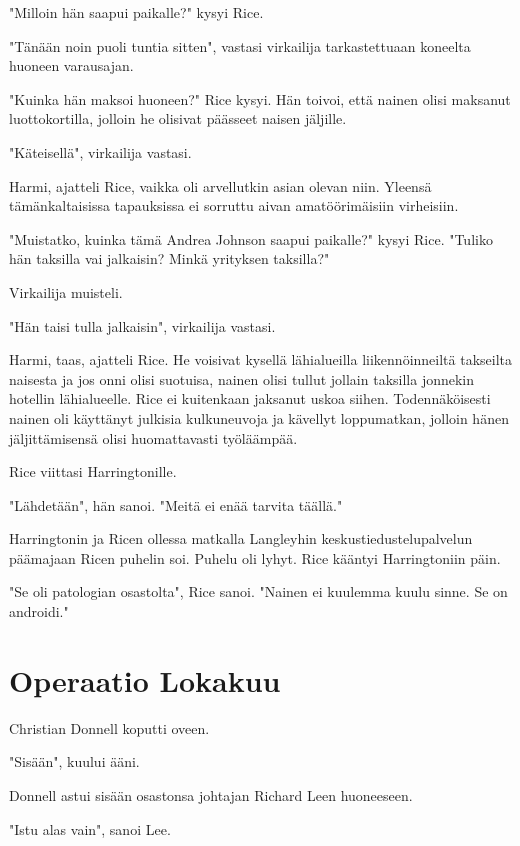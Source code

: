 "Milloin hän saapui paikalle?" kysyi Rice.


"Tänään noin puoli tuntia sitten", vastasi virkailija tarkastettuaan koneelta huoneen varausajan.


"Kuinka hän maksoi huoneen?" Rice kysyi. Hän toivoi, että nainen olisi maksanut luottokortilla, jolloin he olisivat päässeet naisen jäljille.


"Käteisellä", virkailija vastasi.


Harmi, ajatteli Rice, vaikka oli arvellutkin asian olevan niin. Yleensä tämänkaltaisissa tapauksissa ei sorruttu aivan amatöörimäisiin virheisiin.


"Muistatko, kuinka tämä Andrea Johnson saapui paikalle?" kysyi Rice. "Tuliko hän taksilla vai jalkaisin? Minkä yrityksen taksilla?"


Virkailija muisteli.


"Hän taisi tulla jalkaisin", virkailija vastasi.


Harmi, taas, ajatteli Rice. He voisivat kysellä lähialueilla liikennöinneiltä takseilta naisesta ja jos onni olisi suotuisa, nainen olisi tullut jollain taksilla jonnekin hotellin lähialueelle. Rice ei kuitenkaan jaksanut uskoa siihen. Todennäköisesti nainen oli käyttänyt julkisia kulkuneuvoja ja kävellyt loppumatkan, jolloin hänen jäljittämisensä olisi huomattavasti työläämpää.


Rice viittasi Harringtonille.


"Lähdetään", hän sanoi. "Meitä ei enää tarvita täällä."




\psep Harringtonin ja Ricen ollessa matkalla Langleyhin keskustiedustelupalvelun päämajaan Ricen puhelin soi. Puhelu oli lyhyt. Rice kääntyi Harringtoniin päin.


"Se oli patologian osastolta", Rice sanoi. "Nainen ei kuulemma kuulu sinne. Se on androidi."








\chapter{Operaatio Lokakuu}Christian Donnell koputti oveen.


"Sisään", kuului ääni.


Donnell astui sisään osastonsa johtajan Richard Leen huoneeseen.


"Istu alas vain", sanoi Lee.


